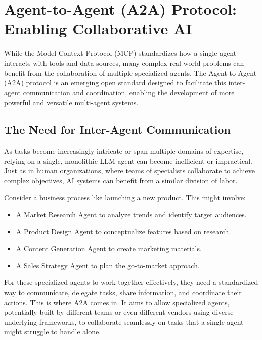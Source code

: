\chapter{Agent-to-Agent (A2A) Protocol: Enabling Collaborative AI}

While the Model Context Protocol (MCP) standardizes how a single agent interacts with tools and data sources, many complex 
real-world problems can benefit from the collaboration of multiple specialized agents. The Agent-to-Agent (A2A) protocol is 
an emerging open standard designed to facilitate this inter-agent communication and coordination, enabling the development of 
more powerful and versatile multi-agent systems.

\section{The Need for Inter-Agent Communication}

As tasks become increasingly intricate or span multiple domains of expertise, relying on a single, monolithic LLM agent can 
become inefficient or impractical. Just as in human organizations, where teams of specialists collaborate to achieve complex objectives, 
AI systems can benefit from a similar division of labor.

Consider a business process like launching a new product. This might involve:

\begin{itemize}
    \item A Market Research Agent to analyze trends and identify target audiences.
    \item A Product Design Agent to conceptualize features based on research.
    \item A Content Generation Agent to create marketing materials.
    \item A Sales Strategy Agent to plan the go-to-market approach.
\end{itemize}

For these specialized agents to work together effectively, they need a standardized way to communicate, delegate tasks, 
share information, and coordinate their actions. This is where A2A comes in. It aims to allow specialized agents, potentially 
built by different teams or even different vendors using diverse underlying frameworks, to collaborate seamlessly on tasks that a 
single agent might struggle to handle alone.

